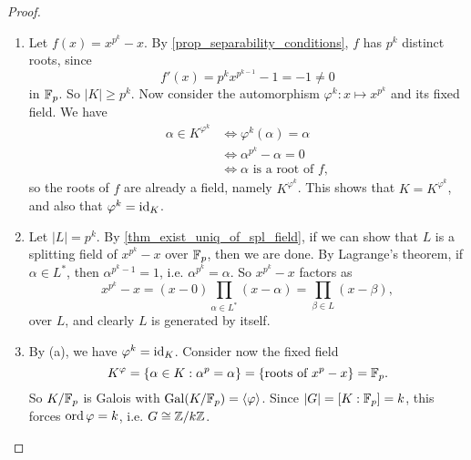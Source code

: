 \begin{proof}~
    \begin{enumerate}[label=(\alph*)]
        \item Let $f(x) = x^{p^k} - x$. By \cref{prop_separability_conditions}, $f$ has $p^k$ distinct roots, since
        \[
            f'(x) = p^k x^{p^{k - 1}} - 1 = -1 \neq 0
        \]
        in $\mathbb{{F}}_p$. So $|K| \geq p^k$. Now consider the automorphism $\varphi^k: x \mapsto x^{p^k}$ and its fixed field. We have
        \begin{align*}
            \alpha \in K^{\varphi^k}
            &\iff \varphi^k(\alpha) = \alpha \\
            &\iff \alpha^{p^k} - \alpha = 0 \\
            &\iff \alpha \text{ is a root of } f,
        \end{align*}
        so the roots of $f$ are already a field, namely $K^{\varphi^k}$. This shows that $K = K^{\varphi^k}$, and also that $\varphi^k = \operatorname{id}_K$.
        
        \item Let $|L| = p^k$. By \cref{thm_exist_uniq_of_spl_field}, if we can show that $L$ is a splitting field of $x^{p^k} - x$ over $\mathbb{{F}}_p$, then we are done. By Lagrange's theorem, if $\alpha \in L^*$, then $\alpha^{p^k - 1} = 1$, i.e. $\alpha^{p^k} = \alpha$. So $x^{p^k} - x$ factors as
        \[
            x^{p^k} - x = (x - 0) \prod_{\alpha \in L^*} (x - \alpha) = \prod_{\beta \in L} (x - \beta),
        \]
        over $L$, and clearly $L$ is generated by itself.
        
        \item By (a), we have $\varphi^k = \operatorname{id}_K$. Consider now the fixed field
        \[
            K^{\varphi} = \{\alpha \in K: \alpha^p = \alpha\} = \{\text{roots of } x^p - x\} = \mathbb{{F}}_p.
        \]
        So $K/\mathbb{{F}}_p$ is Galois with $\operatorname{Gal}(K/\mathbb{{F}}_p) = \langle {\varphi} \rangle$. Since $|G| = [K : \mathbb{{F}}_p] = k$, this forces $\operatorname{ord}{\varphi} = k$, i.e. $G \cong \mathbb{{Z}}/{{k}}\mathbb{{Z}}$. \qedhere
    \end{enumerate}
\end{proof}

